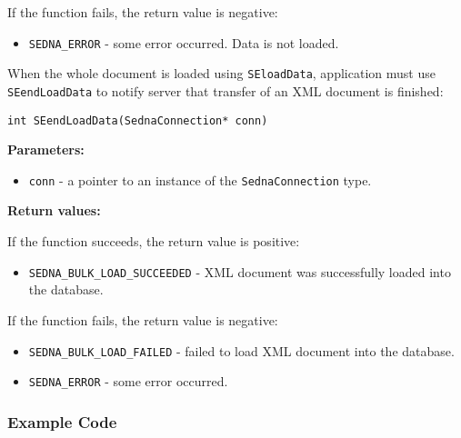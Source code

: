 \documentclass[a4paper,12pt]{article}
\newenvironment{citemize}
{\begin{itemize}
  \setlength{\itemsep}{0pt}
  \setlength{\parskip}{0pt}
  \setlength{\parsep}{0pt}}
{\end{itemize}}
\begin{document}
\noindent
If the function fails, the return value is negative:

\begin{citemize}
\item\verb!SEDNA_ERROR! - some error occurred. Data is not loaded.
\end{citemize}

When the whole document is loaded using \verb!SEloadData!, application must use
\verb!SEendLoadData! to notify server that transfer of an XML document is
finished:

\begin{verbatim}
int SEendLoadData(SednaConnection* conn)
\end{verbatim}

\noindent
\textbf{Parameters:}

\begin{citemize}
\item\verb!conn! - a pointer to an instance of the \verb!SednaConnection! type.
\end{citemize}

\noindent
\textbf{Return values:}

\medskip

\noindent
If the function succeeds, the return value is positive:

\begin{citemize}
\item\verb!SEDNA_BULK_LOAD_SUCCEEDED! - XML document was successfully loaded
into the database.
\end{citemize}

\noindent
If the function fails, the return value is negative:

\begin{citemize}
\item\verb!SEDNA_BULK_LOAD_FAILED! - failed to load XML document into the
database.
\item\verb!SEDNA_ERROR! - some error occurred.
\end{citemize}


\subsubsection{Example Code}
\end{document}
